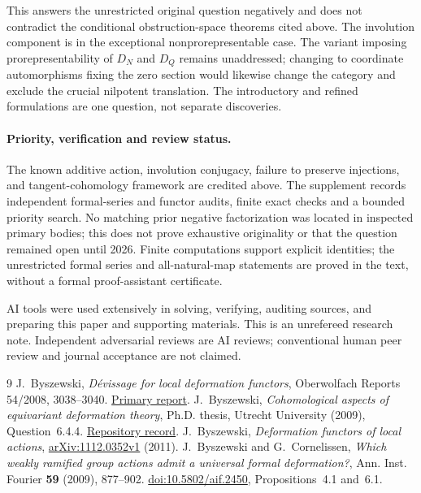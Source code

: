 \documentclass[11pt]{article}
\begin{document}
This answers the unrestricted original question negatively and does not
contradict the conditional obstruction-space theorems cited above.
The involution component is in the exceptional nonprorepresentable case.
The variant imposing prorepresentability of $D_N$ and $D_Q$ remains
unaddressed; changing to coordinate automorphisms fixing the zero section
would likewise change the category and exclude the crucial nilpotent
translation. The introductory and refined formulations are one question,
not separate discoveries.

\paragraph{Priority, verification and review status.}
The known additive action, involution conjugacy, failure to preserve
injections, and tangent-cohomology framework are credited above. The
supplement records independent formal-series and functor audits, finite
exact checks and a bounded priority search. No matching prior negative
factorization was located in inspected primary bodies; this does not prove
exhaustive originality or that the question remained open until 2026.
Finite computations support explicit identities; the unrestricted formal
series and all-natural-map statements are proved in the text, without a
formal proof-assistant certificate.

AI tools were used extensively in solving, verifying, auditing sources, and
preparing this paper and supporting materials. This is an unrefereed research
note. Independent adversarial reviews are AI reviews; conventional human
peer review and journal acceptance are not claimed.

\begin{thebibliography}{9}
 J.~Byszewski, \emph{D\'evissage for local deformation functors},
Oberwolfach Reports 54/2008, 3038--3040.
\href{https://ems.press/content/serial-article-files/46200}{Primary report}.
 J.~Byszewski, \emph{Cohomological aspects of equivariant deformation theory},
Ph.D. thesis, Utrecht University (2009),
Question~6.4.4.
\href{https://dspace.library.uu.nl/handle/1874/33749}{Repository record}.
 J.~Byszewski,
\emph{Deformation functors of local actions},
\href{https://arxiv.org/abs/1112.0352v1}{arXiv:1112.0352v1} (2011).
 J.~Byszewski and G.~Cornelissen,
\emph{Which weakly ramified group actions admit a universal formal deformation?},
Ann. Inst. Fourier \textbf{59} (2009), 877--902.
\href{https://doi.org/10.5802/aif.2450}{doi:10.5802/aif.2450},
Propositions~4.1 and~6.1.
\end{thebibliography}
\end{document}
